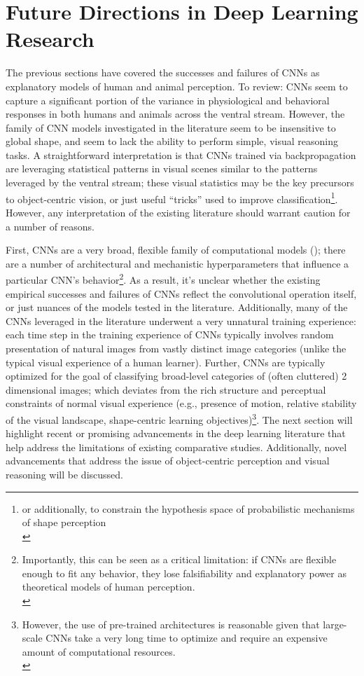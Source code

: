 \documentclass[12pt]{article}
\let\oldcite=\cite
\renewcommand{\cite}[1]{\textcolor[rgb]{0, .121, .388}{\oldcite{#1}}}
\begin{document}


\section{Future Directions in Deep Learning Research}

The previous sections have covered the successes and failures of CNNs as
explanatory models of human and animal perception. To review: CNNs seem to capture a significant portion of the variance in physiological and behavioral responses in both humans and animals across the ventral stream. However, the family of CNN models investigated in the literature seem to be insensitive to global shape, and seem to lack the ability to perform simple, visual reasoning tasks. A straightforward interpretation is that CNNs trained via backpropagation are leveraging statistical patterns in visual scenes similar to the patterns leveraged by the ventral stream; these visual statistics may be the key precursors to object-centric vision, or just useful ``tricks'' used to improve classification\footnote{or additionally, to constrain the hypothesis space of probabilistic mechanisms of shape perception \\}. However, any interpretation of the existing literature should warrant caution for a number of reasons.

First, CNNs are a very broad, flexible family of computational models (\cite{yamins2016using}); there are a number of architectural and mechanistic hyperparameters that influence a particular CNN's behavior\footnote{Importantly, this can be seen as a critical limitation: if CNNs are flexible enough to fit any behavior, they lose falsifiability and explanatory power as theoretical models of human perception. \\}. As a result, it's unclear whether the existing empirical successes and failures of CNNs reflect the convolutional operation itself, or just nuances of the models tested in the literature. Additionally, many of the CNNs leveraged in the literature underwent a very unnatural training experience: each time step in the training experience of CNNs typically involves random presentation of natural images from vastly distinct image categories (unlike the typical visual experience of a human learner). Further, CNNs are typically optimized for the goal of classifying broad-level categories of (often cluttered) 2 dimensional images; which deviates from the rich structure and perceptual constraints of normal visual experience (e.g., presence of motion, relative stability of the visual landscape, shape-centric learning objectives)\footnote{However, the use of pre-trained architectures is reasonable given that large-scale CNNs take a very long time to optimize and require an expensive amount of computational resources. \\}. The next section will highlight recent or promising advancements in the deep learning literature that help address the limitations of existing comparative studies. Additionally, novel advancements that address the issue of object-centric perception and visual reasoning will be discussed.
\end{document}
